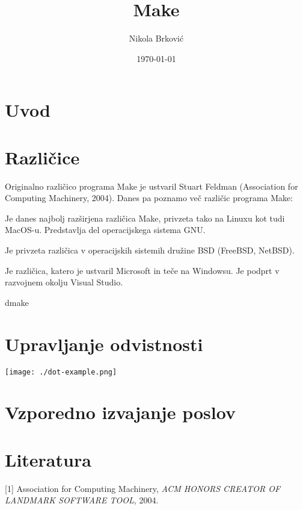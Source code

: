 \documentclass[11pt]{article}
\author{Nikola Brković}
\date{\today}
\title{Make}
\begin{document}
\maketitle
\section{Uvod}
\label{sec:orgeb92cae}

\section{Različice}
\label{sec:org9b31356}

Originalno različico programa Make je ustvaril Stuart
Feldman ({Association for Computing Machinery}, 2004). Danes pa poznamo več različic programa Make:

\begin{description}
\item[{GNU Make}] Je danes najbolj razširjena različica Make, privzeta
tako na Linuxu kot tudi MacOS-u. Predstavlja del operacijskega
sistema GNU.

\item[{BSD Make}] Je privzeta različica v operacijskih sistemih družine
BSD (FreeBSD, NetBSD).

\item[{NMAKE (Microsoft Program Maintenance Utility)}] Je različica,
katero je ustvaril Microsoft in teče na Windowsu. Je podprt v
razvojnem okolju Visual Studio.

\item dmake
\end{description}
\section{Upravljanje odvistnosti}
\label{sec:org60e4a87}

\begin{center}
\texttt{[image: ./dot-example.png]}
\label{org46323e2}
\end{center}
\section{Vzporedno izvajanje poslov}
\label{sec:org1496189}

\section{Literatura}
\label{sec:orgde4e9e6}

\noindent
{[}1] {Association for Computing Machinery}, \emph{ACM HONORS CREATOR OF LANDMARK SOFTWARE TOOL}, 2004.
\end{document}

